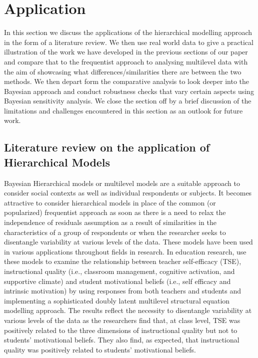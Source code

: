 \section{Application}
\label{sec:application}

In this section we discuss the applications of the hierarchical modelling approach in the form of a literature review. We then use real world data to give a practical illustration of the work we have developed in the previous sections of our paper and compare that to the frequentist approach to analysing multilevel data with the aim of showcasing what differences/similarities there are between the two methods. We then depart form the comparative analysis to look deeper into the Bayesian approach and conduct robustness checks that vary certain aspects using Bayesian sensitivity analysis. We close the section off by a brief discussion of the limitations and challenges encountered in this section as an outlook for future work.


\subsection{Literature review on the application of Hierarchical Models}

Bayesian Hierarchical models or multilevel models are a suitable approach to consider social contexts as well as individual respondents or subjects. It becomes attractive to consider hierarchical models in place of the common (or popularized) frequentist approach as soon as there is a need to relax the independence of residuals assumption as a result of similarities in the characteristics of a group of respondents or when the researcher seeks to disentangle variability at various levels of the data. These models have been used in various applications throughout fields in research. In education research, \cite{buric2020teacher} use these models to examine the relationship between teacher self-efficacy (TSE), instructional quality (i.e., classroom management, cognitive activation, and supportive climate) and student motivational beliefs (i.e., self efficacy and intrinsic motivation) by using responses from both teachers and students and implementing a sophisticated doubly latent multilevel structural equation modelling approach. The results reflect the necessity to disentangle variability at various levels of the data as the researchers find that, at class level, TSE was positively related to the three dimensions of instructional quality but not to students' motivational beliefs. They also find, as expected, that instructional quality was positively related to students’ motivational beliefs.

